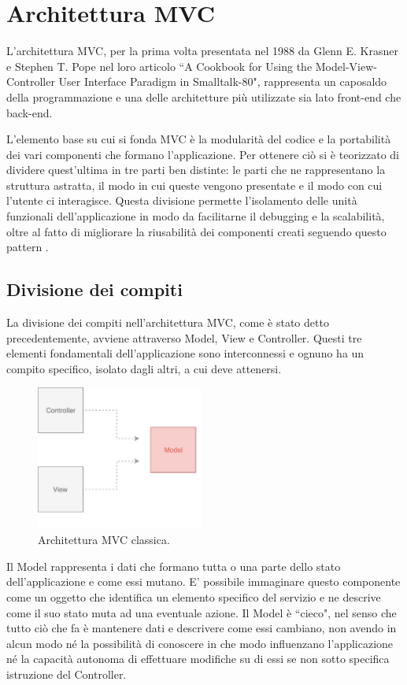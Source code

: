\chapter{Architettura MVC}
L'architettura MVC, per la prima volta presentata nel 1988 da Glenn E. Krasner e Stephen T. Pope nel loro articolo “A Cookbook for Using the Model-View-Controller User Interface Paradigm in Smalltalk-80", rappresenta un caposaldo della programmazione e una delle architetture più utilizzate sia lato front-end che back-end.

L'elemento base su cui si fonda MVC è la modularità del codice e la portabilità dei vari componenti che formano l'applicazione. Per ottenere ciò si è teorizzato di dividere quest'ultima in tre parti ben distinte: le parti che ne rappresentano la struttura astratta, il modo in cui queste vengono presentate e il modo con cui l'utente ci interagisce. Questa divisione permette l'isolamento delle unità funzionali dell'applicazione in modo da facilitarne il debugging e la scalabilità, oltre al fatto di migliorare la riusabilità dei componenti creati seguendo questo pattern \cite{KrasnerAndPopeOnMVC}.

\section{Divisione dei compiti}
La divisione dei compiti nell'architettura MVC, come è stato detto precedentemente, avviene attraverso Model, View e Controller. Questi tre elementi fondamentali dell'applicazione sono interconnessi e ognuno ha un compito specifico, isolato dagli altri, a cui deve attenersi.

\begin{figure}
\centering 
\includegraphics[width=5.5cm]{./images/MVCdefault}
\caption{Architettura MVC classica.}
\end{figure}

Il Model rappresenta i dati che formano tutta o una parte dello stato dell'applicazione e come essi mutano. E' possibile immaginare questo componente come un oggetto che identifica un elemento specifico del servizio e ne descrive come il suo stato muta ad una eventuale azione. Il Model è “cieco", nel senso che tutto ciò che fa è mantenere dati e descrivere come essi cambiano, non avendo in alcun modo né la possibilità di conoscere in che modo influenzano l'applicazione né la capacità autonoma di effettuare modifiche su di essi se non sotto specifica istruzione del Controller.


